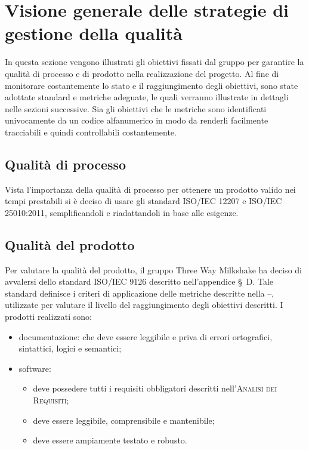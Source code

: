 \section{Visione generale delle strategie di gestione della qualità}
In questa sezione vengono illustrati gli obiettivi fissati dal gruppo per garantire la qualità di processo e di prodotto nella realizzazione del progetto.
Al fine di monitorare costantemente lo stato e il raggiungimento degli obiettivi, sono state adottate standard e metriche adeguate, le quali verranno illustrate in dettagli nelle sezioni successive.
Sia gli obiettivi che le metriche sono identificati univocamente da un codice alfanumerico in modo da renderli facilmente tracciabili e quindi controllabili costantemente.

\subsection{Qualità di processo}
Vista l’importanza della qualità di processo per ottenere un prodotto valido nei tempi prestabili si è deciso di usare gli standard ISO/IEC 12207 e ISO/IEC 25010:2011, semplificandoli e riadattandoli in base alle esigenze. 

\subsection{Qualità del prodotto}
Per valutare la qualità del prodotto, il gruppo Three Way Milkshake ha deciso di avvalersi dello standard ISO/IEC 9126 descritto nell'appendice \S\ D. Tale standard definisce i criteri di applicazione delle metriche descritte nella --, utilizzate per valutare il livello del raggiungimento degli obiettivi descritti.
I prodotti realizzati sono:
\begin{itemize}
    \item documentazione: che deve essere leggibile e priva di errori ortografici, sintattici, logici e semantici;
    \item software: 
    \begin{itemize}
        \item deve possedere tutti i requisiti obbligatori descritti nell'\textsc{Analisi dei Requisiti};
        \item deve essere leggibile, comprensibile e mantenibile;
        \item deve essere ampiamente testato e robusto.
    \end{itemize}
\end{itemize}

